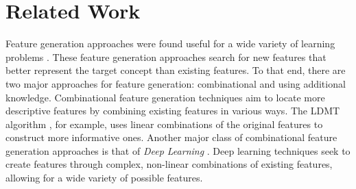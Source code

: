 \documentclass[twoside,11pt]{article}
\theoremstyle{definition}
\begin{document}





\section{Related Work}

Feature generation approaches were found useful for a wide variety of learning problems \cite{markovitch2002feature,ragavan1993complex,utgo1991linear}.
These feature generation approaches search for new features that better represent the target concept than existing features. To that end, there are two major approaches for feature generation: combinational and using additional knowledge.
Combinational feature generation techniques aim to locate more descriptive features by combining existing features in various ways. The LDMT algorithm \cite{utgo1991linear}, for example, uses linear combinations of the original features to construct more informative ones. Another major class of combinational feature generation approaches is that of \emph{Deep Learning} \cite{lecun1998gradient,bengio2009learning,plotz2011featurefull,kim2013deepfull}. Deep learning techniques seek to create features through complex, non-linear combinations of existing features, allowing for a wide variety of possible features.
\end{document}
